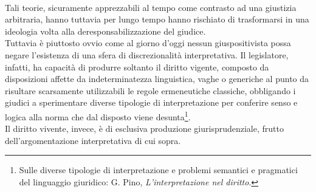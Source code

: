 \\Tali teorie, sicuramente apprezzabili al tempo come contrasto ad una giustizia arbitraria, hanno tuttavia per lungo tempo hanno rischiato di trasformarsi in una ideologia volta alla deresponsabilizzazione del giudice.
\\Tuttavia è piuttosto ovvio come al giorno d'oggi nessun giuspositivista possa negare l'esistenza di una sfera di discrezionalità interpretativa.
Il legislatore, infatti, ha capacità di produrre soltanto il diritto vigente, composto da disposizioni affette da indeterminatezza linguistica, vaghe o generiche al punto da risultare scarsamente utilizzabili le regole ermeneutiche classiche, obbligando i giudici a sperimentare diverse tipologie di interpretazione per conferire senso e logica alla norma che dal disposto viene desunta\footnote{Sulle diverse tipologie di interpretazione e problemi semantici e pragmatici del linguaggio giuridico: G. Pino, \textit{L'interpretazione nel diritto}.}. 
\\Il diritto vivente, invece, è di esclusiva produzione giurisprudenziale, frutto dell'argomentazione interpretativa di cui sopra.

